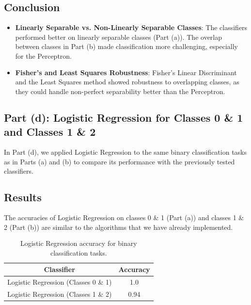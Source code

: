 \documentclass[a4paper, 11pt]{article}
\begin{document}
	\subsection*{Conclusion}
	
	\begin{itemize}
		\item \textbf{Linearly Separable vs. Non-Linearly Separable Classes}: The classifiers performed better on linearly separable classes (Part (a)). The overlap between classes in Part (b) made classification more challenging, especially for the Perceptron.
		\item \textbf{Fisher’s and Least Squares Robustness}: Fisher’s Linear Discriminant and the Least Squares method showed robustness to overlapping classes, as they could handle non-perfect separability better than the Perceptron.
	\end{itemize}
	
	\newpage
	\subsection*{Part (d): Logistic Regression for Classes 0 \& 1 and Classes 1 \& 2}
	
	In Part (d), we applied Logistic Regression to the same binary classification tasks as in Parts (a) and (b) to compare its performance with the previously tested classifiers.
	
	\subsection*{Results}
	
	The accuracies of Logistic Regression on classes 0 \& 1 (Part (a)) and classes 1 \& 2 (Part (b)) are similar to the algorithms that we have already implemented.
	
	\begin{table}[h!]
		\centering
		\begin{tabular}{|c|c|}
			\hline
			\textbf{Classifier} & \textbf{Accuracy} \\
			\hline
			Logistic Regression (Classes 0 \& 1) & 1.0 \\ 
			Logistic Regression (Classes 1 \& 2) & 0.94 \\ 
			\hline
		\end{tabular}
		\caption{Logistic Regression accuracy for binary classification tasks.}
	\end{table}
	
	
	
	\newpage
\end{document}
